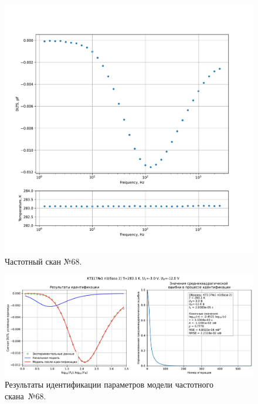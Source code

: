 \begin{figure}[!ht]
    \centering
    \includegraphics[width=1\textwidth]{../plots/КТ117№1_п1(база 2)_2500Гц-1Гц_1пФ_+10С_-3В-12В_200мВ_20мкс_шаг_0,1.pdf}
    \caption{Частотный скан №68.}
    \label{pic:frequency_scan_68}
\end{figure}

\begin{figure}[!ht]
    \centering
    \includegraphics[width=1\textwidth]{../plots/КТ117№1_п1(база 2)_2500Гц-1Гц_1пФ_+10С_-3В-12В_200мВ_20мкс_шаг_0,1_model.pdf}
    \caption{Результаты идентификации параметров модели частотного скана~№68.}
    \label{pic:frequency_scan_model68}
\end{figure}

\pagebreak


